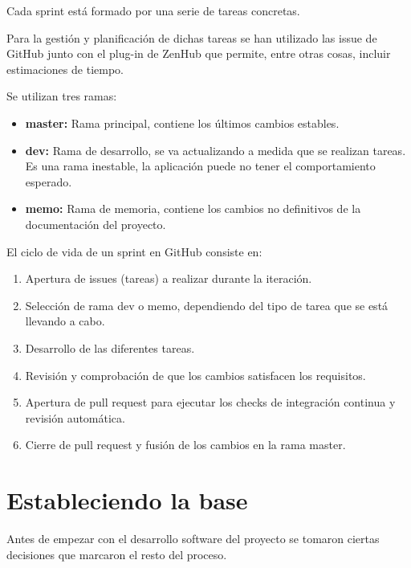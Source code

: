 Cada sprint está formado por una serie de tareas concretas.

Para la gestión y planificación de dichas tareas se han utilizado las issue de GitHub junto con el plug-in de ZenHub que permite, entre otras cosas, incluir estimaciones de tiempo.


Se utilizan tres ramas:

\begin{itemize}
\tightlist
	\item \textbf{master:} Rama principal, contiene los últimos cambios estables.
	\item \textbf{dev:} Rama de desarrollo, se va actualizando a medida que se realizan tareas. Es una rama inestable, la aplicación puede no tener el comportamiento esperado.
	\item \textbf{memo:} Rama de memoria, contiene los cambios no definitivos de la documentación del proyecto.
\end{itemize}


El ciclo de vida de un sprint en GitHub consiste en:

\begin{enumerate}
	\item Apertura de issues (tareas) a realizar durante la iteración.
	\item Selección de rama dev o memo, dependiendo del tipo de tarea que se está llevando a cabo.
	\item Desarrollo de las diferentes tareas.
	\item Revisión y comprobación de que los cambios satisfacen los requisitos.
	\item Apertura de pull request para ejecutar los checks de integración continua y revisión automática.
	\item Cierre de pull request y fusión de los cambios en la rama master.
\end{enumerate}


\section{Estableciendo la base}

Antes de empezar con el desarrollo software del proyecto se tomaron ciertas decisiones que marcaron el resto del proceso.

